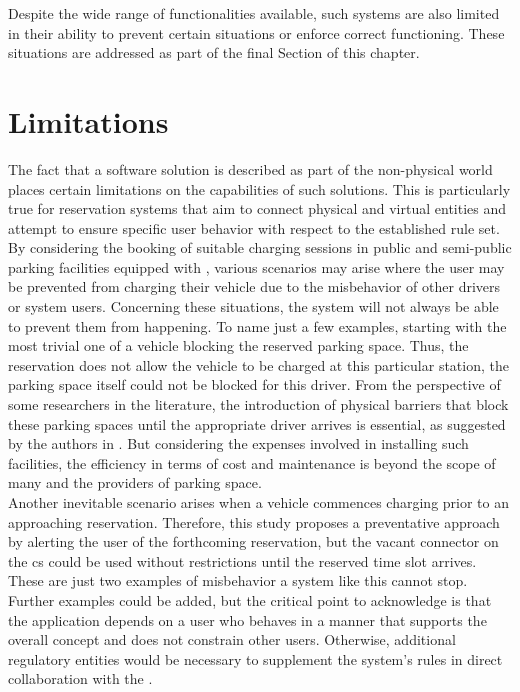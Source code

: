 \noindent Despite the wide range of functionalities available, such systems are also limited in their ability to prevent certain situations or enforce correct functioning. These situations are addressed as part of the final Section of this chapter.

\section{Limitations}
\label{ch:Analysis and Validation:sec:Limitations}

The fact that a software solution is described as part of the non-physical world places certain limitations on the capabilities of such solutions. 
This is particularly true for reservation systems that aim to connect physical and virtual entities and attempt to ensure specific user behavior with respect to the established rule set.
By considering the booking of suitable charging sessions in public and semi-public parking facilities equipped with , various scenarios may arise where the user may be prevented from charging their vehicle due to the misbehavior of other drivers or system users. 
Concerning these situations, the system will not always be able to prevent them from happening.
To name just a few examples, starting with the most trivial one of a vehicle blocking the reserved parking space. Thus, the reservation does not allow the vehicle to be charged at this particular station, the parking space itself could not be blocked for this driver.
From the perspective of some researchers in the literature, the introduction of physical barriers that block these parking spaces until the appropriate driver arrives is essential, as suggested by the authors in \cite{basmadjian_reference_2020}.
But considering the expenses involved in installing such facilities, the efficiency in terms of cost and maintenance is beyond the scope of many  and the providers of parking space. \\
Another inevitable scenario arises when a vehicle commences charging prior to an approaching reservation. Therefore, this study proposes a preventative approach by alerting the user of the forthcoming reservation, but the vacant connector on the \acrshort{cs} could be used without restrictions until the reserved time slot arrives.
These are just two examples of misbehavior a system like this cannot stop. Further examples could be added, but the critical point to acknowledge is that the application depends on a user who behaves in a manner that supports the overall concept and does not constrain other users.
Otherwise, additional regulatory entities would be necessary to supplement the system's rules in direct collaboration with the .
